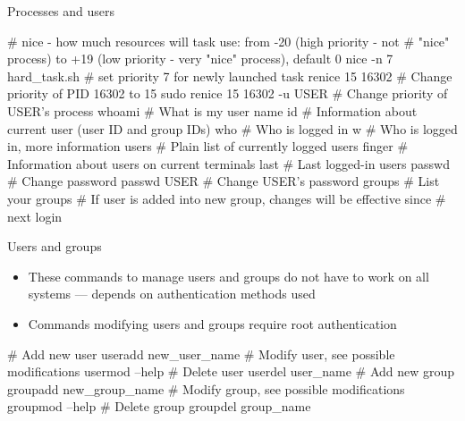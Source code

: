 \documentclass[compress, xelatex, 11pt, xcolor=svgnames, aspectratio=169,
	hyperref={
		bookmarks=true,
		unicode=true,
		colorlinks=true,
		pdftitle={Linux, command line and MetaCentrum},
		plainpages=false,
		pdfauthor={Vojtech Zeisek},
		pdfsubject={Course about use of Linux command line, writing shell scripts and using MetaCentrum of CESNET},
		pdfcreator={XeLaTeX},
		pdfkeywords={Linux, GNU, BASH, shell, command line, MetaCentrum},
		linkcolor=DarkRed, %
		anchorcolor=DarkBlue, %
		citecolor=Indigo, %
		filecolor=NavyBlue, %
		menucolor=DarkMagenta, %
		urlcolor=DarkBlue, %
		},
	url={hyphens, lowtilde} %
	]{beamer}
\begin{document}
\begin{frame}[fragile]{Processes and users}
	\begin{bashcode}
    # nice - how much resources will task use: from -20 (high priority - not
    # "nice" process) to +19 (low priority - very "nice" process), default 0
    nice -n 7 hard_task.sh # set priority 7 for newly launched task
    renice 15 16302 # Change priority of PID 16302 to 15
    sudo renice 15 16302 -u USER # Change priority of USER's process
    whoami # What is my user name
    id # Information about current user (user ID and group IDs)
    who # Who is logged in
    w # Who is logged in, more information
    users # Plain list of currently logged users
    finger # Information about users on current terminals
    last # Last logged-in users
    passwd # Change password
    passwd USER # Change USER's password
    groups # List your groups
    # If user is added into new group, changes will be effective since
    # next login
	\end{bashcode}
\end{frame}

\begin{frame}[fragile]{Users and groups}
	\begin{itemize}
		\item These commands to manage users and groups do not have to work on all systems --- depends on authentication methods used
		\item Commands modifying users and groups require root authentication
	\end{itemize}
	\begin{bashcode}
    # Add new user
    useradd new_user_name
    # Modify user, see possible modifications
    usermod --help
    # Delete user
    userdel user_name
    # Add new group
    groupadd new_group_name
    # Modify group, see possible modifications
    groupmod --help
    # Delete group
    groupdel group_name
	\end{bashcode}
\end{frame}
\end{document}
